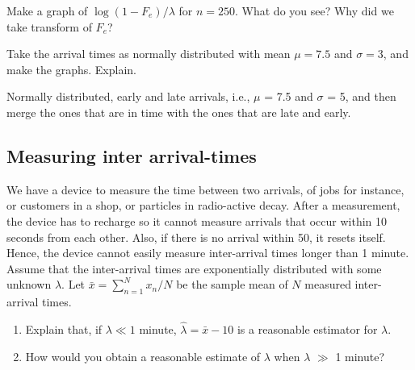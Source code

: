 \documentclass[assignments]{subfiles}
\begin{document}
\begin{exercise}
Make a graph of  $\log(1-F_e)/\lambda$  for $n=250$. What do you see? Why did we take transform of $F_e$?
\end{exercise}


\begin{exercise}
Take the arrival times as normally distributed with mean $\mu=7.5$ and $\sigma=3$, and make the graphs. Explain. 
\end{exercise}

Normally distributed, early and late arrivals, i.e., \(\mu\) = 7.5 and \(\sigma\) = 5, and then merge the ones that are in time with the ones that are late and early. 





\subsection{Measuring inter arrival-times}
\label{sec:orgf820334}

We have a device to measure the time between two arrivals, of jobs for instance, or customers in a shop, or particles in radio-active decay.
After a measurement, the device has to recharge so it cannot measure arrivals that occur within 10 seconds from each other.
Also, if there is no arrival within 50, it resets itself.
Hence, the device cannot easily measure inter-arrival times longer than 1 minute. Assume that the inter-arrival times are exponentially distributed with some unknown \(\lambda\). Let \(\bar x = \sum_{n=1}^N x_{n} /N\) be the sample mean of \(N\) measured inter-arrival times. 

\begin{enumerate}
\item Explain that, if \(\lambda \ll 1\) minute,  \(\hat \lambda = \bar x - 10\) is a reasonable estimator for \(\lambda\).
\item How would you obtain a reasonable estimate of \(\lambda\) when \(\lambda\) \(\gg\) 1 minute?
\end{enumerate}
\end{document}

